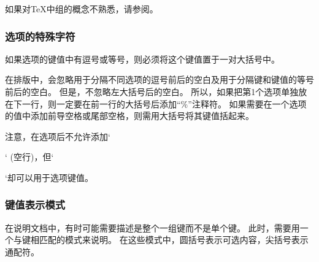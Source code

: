如果对\TeX{}中组的概念不熟悉，请参阅。

\subsubsection{选项的特殊字符}
\label{special-characters-in-options}

如果选项的键值中有逗号或等号，则必须将这个键值置于一对大括号中。

在排版中，会忽略用于分隔不同选项的逗号前后的空白及用于分隔键和键值的等号前后的空白。
但是，不忽略左大括号后的空白。
所以，如果把第1个选项单独放在下一行，则一定要在前一行的大括号后添加\enquote{\%}注释符。
如果需要在一个选项的值中添加前导空格或尾部空格，则需用大括号将其键值括起来。

注意，在选项后不允许添加`\par` (空行)，但`\par`却可以用于选项键值。

\subsubsection{键值表示模式}
\label{key-patterns}

在说明文档中，有时可能需要描述是整个一组键而不是单个键。
此时，需要用一个与键相匹配的模式来说明。
在这些模式中，圆括号表示可选内容，尖括号表示通配符。

